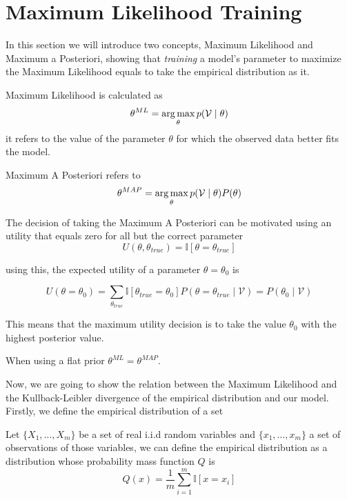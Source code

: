 

\section{Maximum Likelihood Training}

In this section we will introduce two concepts, Maximum Likelihood and Maximum a
Posteriori, showing that \emph{training} a model's parameter to maximize the
Maximum Likelihood equals to take the empirical distribution as it.

\begin{definition}
  Maximum Likelihood is calculated as
  \[
    \theta^{ML} = \operatorname*{arg\,max}_\theta p(\mathcal{V} \mid \theta)
  \]
   it refers to the value of the parameter
\(\theta\) for which the observed data better fits the model.
\end{definition}

\begin{definition}
  Maximum A Posteriori refers to
  \[
    \theta^{MAP} = \operatorname*{arg\,max}_\theta p(\mathcal{V} \mid \theta)P(\theta)
  \]
\end{definition}

The decision of taking the Maximum A Posteriori can be motivated using an
utility that equals zero for all but the correct parameter
\[
  U(\theta, \theta_{true}) = \mathbb{I}[\theta = \theta_{true}]
\]

using this, the expected utility of a parameter \(\theta = \theta_0\) is

\[
  U(\theta = \theta_0) = \sum_{\theta_{true}}\mathbb{I}[\theta_{true} = \theta_0]P(\theta = \theta_{true}  \mid  \mathcal{V}) = P(\theta_0  \mid  \mathcal{V})
\]

This means that the maximum utility decision is to take the value \(\theta_0\)
with the highest posterior value.

\begin{remark}
When using a flat prior \(\theta^{ML}= \theta ^{MAP}\).
\end{remark}



Now, we are going to show the relation between the Maximum Likelihood and the
Kullback-Leibler divergence of the empirical distribution and our model.
Firstly, we define the empirical distribution of a set

Let \(\{X_1, \dots, X_m\}\) be a set of real i.i.d random variables and
\(\{x_{1}, \dots, x_{m}\}\) a set of observations of those variables, we can define the
empirical distribution as a distribution whose probability mass function
\(Q\) is
\[
  Q(x) = \frac{1}{m}\sum_{i = 1}^m \mathbb{I}[x = x_i]
\]


